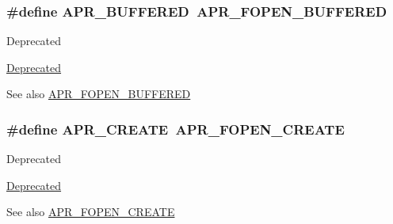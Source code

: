 \subsubsection[{\texorpdfstring{A\+P\+R\+\_\+\+B\+U\+F\+F\+E\+R\+ED}{APR_BUFFERED}}]{\setlength{\rightskip}{0pt plus 5cm}\#define A\+P\+R\+\_\+\+B\+U\+F\+F\+E\+R\+ED~{\bf A\+P\+R\+\_\+\+F\+O\+P\+E\+N\+\_\+\+B\+U\+F\+F\+E\+R\+ED}}\hypertarget{group__apr__file__open__flags_ga6edc818199e8b90e3dabf97c42a27158}{}\label{group__apr__file__open__flags_ga6edc818199e8b90e3dabf97c42a27158}
\begin{DoxyRefDesc}{Deprecated}
\item[\hyperlink{deprecated__deprecated000024}{Deprecated}]\end{DoxyRefDesc}
\begin{DoxySeeAlso}{See also}
\hyperlink{group__apr__file__open__flags_gac48fd4c853c9f561632a2e8aaf5d8d97}{A\+P\+R\+\_\+\+F\+O\+P\+E\+N\+\_\+\+B\+U\+F\+F\+E\+R\+ED} 
\end{DoxySeeAlso}
\subsubsection[{\texorpdfstring{A\+P\+R\+\_\+\+C\+R\+E\+A\+TE}{APR_CREATE}}]{\setlength{\rightskip}{0pt plus 5cm}\#define A\+P\+R\+\_\+\+C\+R\+E\+A\+TE~{\bf A\+P\+R\+\_\+\+F\+O\+P\+E\+N\+\_\+\+C\+R\+E\+A\+TE}}\hypertarget{group__apr__file__open__flags_gac210e96bc821dbaa83c326e775dad028}{}\label{group__apr__file__open__flags_gac210e96bc821dbaa83c326e775dad028}
\begin{DoxyRefDesc}{Deprecated}
\item[\hyperlink{deprecated__deprecated000019}{Deprecated}]\end{DoxyRefDesc}
\begin{DoxySeeAlso}{See also}
\hyperlink{group__apr__file__open__flags_gafe94f21ccbf411172e70e7f473af251a}{A\+P\+R\+\_\+\+F\+O\+P\+E\+N\+\_\+\+C\+R\+E\+A\+TE} 
\end{DoxySeeAlso}
